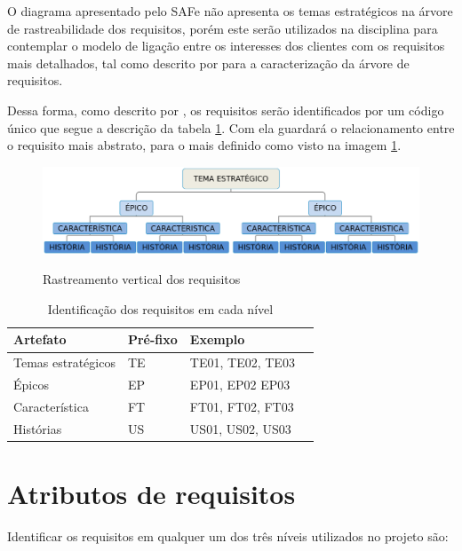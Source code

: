 O diagrama apresentado pelo SAFe não apresenta os temas estratégicos na árvore de rastreabilidade dos requisitos, porém este serão utilizados na disciplina para contemplar o modelo de ligação entre os interesses dos clientes com os requisitos mais detalhados, tal como descrito por \cite{leffingwell2011} para a caracterização da árvore de requisitos.

Dessa forma, como descrito por \cite{silva2011}, os requisitos serão identificados por um código único que segue a descrição da tabela \ref{identificadores}. Com ela guardará o relacionamento entre o requisito mais abstrato, para o mais definido como visto na imagem \ref{rastreabilidade}.
\begin{figure}[H]
    \centering
    \caption{Rastreamento vertical dos requisitos}
    \includegraphics[keepaspectratio=true,scale=0.4]{figuras/rastreabilidade.eps}
    \label{rastreabilidade}
\end{figure}
\begin{table}[h]
    \centering
    \caption{Identificação dos requisitos em cada nível}
    \label{identificadores}
    \begin{tabular}{l|l|l|l}
        Artefato & Pré-fixo & Exemplo \\
        \hline    
        Temas estratégicos & TE & TE01, TE02, TE03 \\
        Épicos & EP & EP01, EP02 EP03 \\
        Característica & FT & FT01, FT02, FT03 \\
        Histórias & US & US01, US02, US03 \\
    \end{tabular}
\end{table}

\section{Atributos de requisitos}

Identificar os requisitos em qualquer um dos três níveis utilizados no projeto são:

